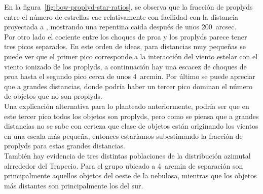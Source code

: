 En la figura~\ref{fig:bow-proplyd-star-ratios}, se observa que la fracción de proplyds entre el número de estrellas cae relativamente con facilidad con la distancia proyectada a \thC{}, mostrando una repentina caida después de unos 200~arcsec.\\

Por otro lado el cociente entre los choques de proa y los proplyds parece tener tres picos separados. En este orden de ideas, para distancias muy pequeñas se puede ver que el primer pico corresponde a la interacción del viento estelar con el viento ionizado de los proplyds, a continuación hay una escacez de choques de proa hasta el segundo pico cerca de unos 4~arcmin. Por último se puede apreciar que  a grandes distancias, donde podría haber un tercer pico dominan el número de objetos que no son proplyds.\\

 Una explicación alternativa para lo planteado anteriormente, podría ser que en este tercer pico todos los objetos son proplyds, pero como se piensa que a grandes distancias no se sabe con certeza que clase de objetos están originando los vientos en una escala más pequeña, entonces estaríamos subestimando  la fracción de proplyds para estas grandes distancias.\\

También hay evidencia de tres distintas poblaciones de la distribución azimutal alrrededor del Trapecio. Para el grupo ubicado a 4~arcmin de separación son principalmente aquellos objetos del oeste de la nebulosa, mientras que los objetos más distantes son principalmente los del sur.    

%

%
